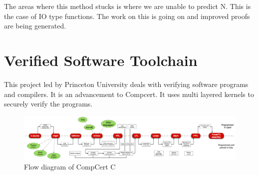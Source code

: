 The areas where this method stucks is where we are unable to predict N. This is the case of IO type functions. The work on this is going on and improved proofs are being generated.\\


\section{Verified Software Toolchain}
This project led by Princeton University deals with verifying software programs and compilers. It is an advancement to Compcert. It uses multi layered kernels to securely verify the programs.  

\begin{figure}[!htb]
\centering
  \includegraphics[width=\textwidth]{diagram}
  \caption{Flow diagram of CompCert C}
\end{figure}

